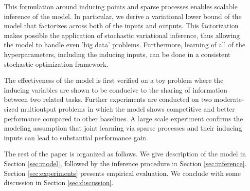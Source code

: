 This formulation around inducing points and sparse processes enables scalable inference of the model.
In particular, we derive a variational lower bound of the model that factorizes across both of the inputs and outputs.
This factorization makes possible the application of stochastic variational inference, thus allowing the model to handle even 'big data' problems.
Furthermore, learning of all of the  hyperparameters, including the inducing inputs, can be done in a consistent stochastic optimization framework.

The effectiveness of the model is first verified on a toy problem where the inducing variables are shown to be conducive to the sharing of information between two related tasks. 
Further experiments are conducted on two moderate-sized multioutput problems in which the model shows competitive and better performance compared to other baselines.
A large scale experiment confirms the modeling assumption that joint learning via sparse processes and their inducing inputs can lead to substantial performance gain.
 
The rest of the paper is organized as follows.
We give description of the model in Section \ref{sec:model}, followed by the inference procedure in Section \ref{sec:inference}. 
Section \ref{sec:experiments} presents empirical evaluation.
We conclude with some discussion in Section \ref{sec:discussion}.



